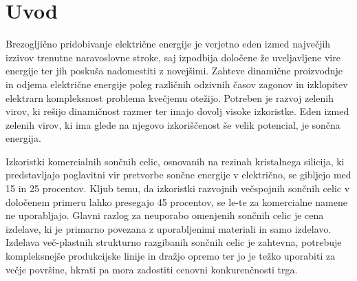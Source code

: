\documentclass[a4paper,twoside,openright,12pt,slovene]{book}
\begin{document}
\chapter{Uvod} \label{uvod}

Brezogljično pridobivanje električne energije je verjetno eden izmed največjih izzivov trenutne naravoslovne stroke, saj izpodbija določene že uveljavljene vire energije ter jih poskuša nadomestiti z novejšimi. Zahteve dinamične proizvodnje in odjema električne energije poleg različnih odzivnih časov zagonov in izklopitev elektrarn kompleksnost problema kvečjemu otežijo. Potreben je razvoj zelenih virov, ki rešijo dinamičnost razmer ter imajo dovolj visoke izkoristke. Eden izmed zelenih virov, ki ima glede na njegovo izkoriščenost še velik potencial, je sončna energija. \cite{Nas_stik_SAZU}

Izkoristki komercialnih sončnih celic, osnovanih na rezinah kristalnega silicija, ki predstavljajo poglavitni vir pretvorbe sončne energije v električno, se gibljejo med 15 in 25 procentov. Kljub temu, da izkoristki razvojnih večspojnih sončnih celic v določenem primeru lahko presegajo 45 procentov, se le-te za komercialne namene ne uporabljajo. Glavni razlog za neuporabo omenjenih sončnih celic je cena izdelave, ki je primarno povezana z uporabljenimi materiali in samo izdelavo. Izdelava več-plastnih strukturno razgibanih sončnih celic je zahtevna, potrebuje kompleksnejše produkcijske linije in dražjo opremo ter jo je težko uporabiti za večje površine, hkrati pa mora zadostiti cenovni konkurenčnosti trga. 
\end{document}
